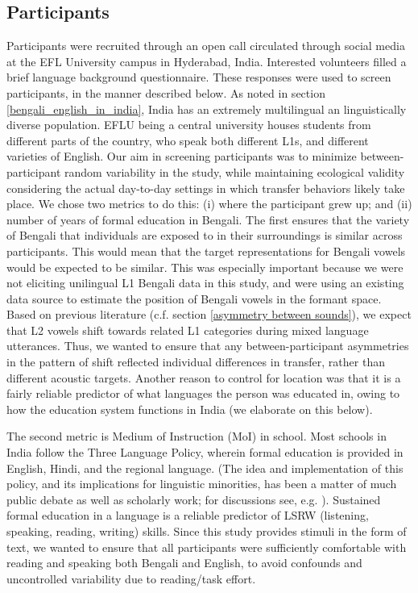 \documentclass[12 pt]{article}
\begin{document}
\subsection{Participants} \label{participants}
Participants were recruited through an open call  circulated through social media at the EFL University campus in Hyderabad, India. Interested volunteers filled a brief language background questionnaire. These responses were used to screen participants, in the manner described below. 
As noted in section \ref{bengali_english_in_india}, India has an extremely multilingual an linguistically diverse population. EFLU being a central university houses students from different parts of the country, who speak both different L1s, and different varieties of English. Our aim in screening participants was to minimize between-participant random variability in the study, while maintaining ecological validity considering the actual day-to-day settings in which transfer behaviors likely take place. We chose two metrics to do this: (i) where the participant grew up; and (ii) number of years of formal education in Bengali. The first ensures that the variety of Bengali that individuals are exposed to in their surroundings is similar across participants. This would mean that the target representations for Bengali vowels would be expected to be similar. This was especially important because we were not eliciting unilingual L1 Bengali data in this study, and were using an existing data source to estimate the position of Bengali vowels in the formant space. Based on previous literature (c.f. section \ref{asymmetry between sounds}), we expect that L2 vowels shift towards related L1 categories during mixed language utterances. Thus, we wanted to ensure that any between-participant asymmetries in the pattern of shift reflected individual differences in transfer, rather than different acoustic targets. Another reason to control for location was that it is a fairly reliable predictor of what languages the person was educated in, owing to how the education system functions in India (we elaborate on this below).

The second metric is Medium of Instruction (MoI) in school. Most schools in India follow the Three Language Policy, wherein formal education is provided in English, Hindi, and the regional language. (The idea and implementation of this policy, and its implications for linguistic minorities, has been a matter of much public debate as well as scholarly work; for discussions see, e.g. \cite{tollefson2014language, jhingran2009hundreds, khubchandani1997language, mohanty2009multilingual, ramanathan2005rethinking}). Sustained formal education in a language is a reliable predictor of LSRW (listening, speaking, reading, writing) skills. Since this study provides stimuli in the form of text, we wanted to ensure that all participants were sufficiently comfortable with reading and speaking both Bengali and English, to avoid confounds and uncontrolled variability due to reading/task effort.  
\end{document}
